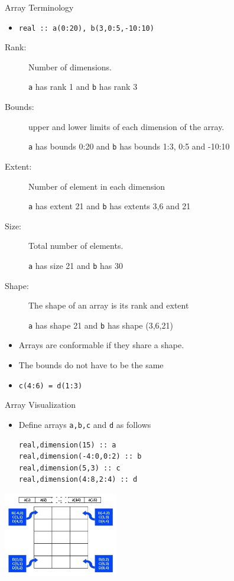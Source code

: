 \documentclass[c,mathserif,compress,xcolor=svgnames]{beamer}
\newcommand{\lstfortran}[1]{\lstinline[language={[90]Fortran},basicstyle=\footnotesize\ttfamily]|#1|}
\begin{document}
\begin{frame}{Array Terminology}
  \begin{itemize}
    \item[] \lstfortran{real :: a(0:20), b(3,0:5,-10:10)}
  \end{itemize}
  \begin{description}
    \item[Rank:] Number of dimensions.
    \item[] {\lstfortran{a}} has rank 1 and {\lstfortran{b}} has rank 3
    \item[Bounds:] upper and lower limits of each dimension of the array.
    \item[] {\lstfortran{a}} has bounds 0:20 and {\lstfortran{b}} has bounds 1:3, 0:5 and -10:10
    \item[Extent:] Number of element in each dimension
    \item[] {\lstfortran{a}} has extent 21 and {\lstfortran{b}} has extents 3,6 and 21
    \item[Size:] Total number of elements.
    \item[] {\lstfortran{a}} has size 21 and {\lstfortran{b}} has 30
    \item[Shape:] The shape of an array is its rank and extent
    \item[] \lstfortran{a} has shape 21 and \lstfortran{b} has shape (3,6,21)
  \end{description}
  \begin{itemize}
    \item Arrays are conformable if they share a shape.
    \item The bounds do not have to be the same
    \item[] \lstfortran{c(4:6) = d(1:3)}
  \end{itemize}
\end{frame}

\begin{frame}[fragile]{Array Visualization}
  \begin{itemize}
    \item Define arrays \lstfortran{a,b,c} and \lstfortran{d} as follows
      \begin{lstlisting}[language={[90]Fortran}]
real,dimension(15) :: a
real,dimension(-4:0,0:2) :: b
real,dimension(5,3) :: c
real,dimension(4:8,2:4) :: d
      \end{lstlisting}
  \end{itemize}
  \begin{center}
    \includegraphics[width=5cm,clip=true]{./graphics/array2-3-1}
  \end{center}
\end{frame}
\end{document}
